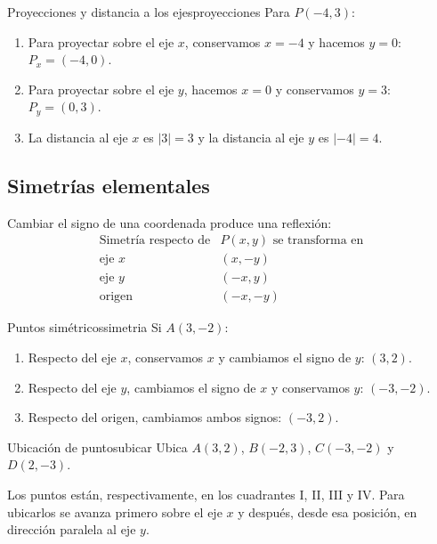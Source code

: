 \begin{example}{Proyecciones y distancia a los ejes}{proyecciones}
Para $P(-4,3)$:
\begin{enumerate}[label=\textbf{Paso \arabic*.}]
  \item Para proyectar sobre el eje $x$, conservamos $x=-4$ y hacemos $y=0$:
  $P_x=(-4,0)$.
  \item Para proyectar sobre el eje $y$, hacemos $x=0$ y conservamos $y=3$:
  $P_y=(0,3)$.
  \item La distancia al eje $x$ es $|3|=3$ y la distancia al eje $y$ es
  $|-4|=4$.
\end{enumerate}
\end{example}

\subsection{Simetrías elementales}

Cambiar el signo de una coordenada produce una reflexión:
\[
\begin{array}{c|c}
\text{Simetría respecto de} & P(x,y)\text{ se transforma en}\\ \hline
\text{eje }x & (x,-y)\\
\text{eje }y & (-x,y)\\
\text{origen} & (-x,-y)
\end{array}
\]

\begin{example}{Puntos simétricos}{simetria}
Si $A(3,-2)$:
\begin{enumerate}[label=\textbf{Paso \arabic*.}]
  \item Respecto del eje $x$, conservamos $x$ y cambiamos el signo de $y$:
  $(3,2)$.
  \item Respecto del eje $y$, cambiamos el signo de $x$ y conservamos $y$:
  $(-3,-2)$.
  \item Respecto del origen, cambiamos ambos signos: $(-3,2)$.
\end{enumerate}
\end{example}

\begin{example}{Ubicación de puntos}{ubicar}
Ubica $A(3,2)$, $B(-2,3)$, $C(-3,-2)$ y $D(2,-3)$.

\begin{center}
\end{center}
Los puntos están, respectivamente, en los cuadrantes I, II, III y IV.
Para ubicarlos se avanza primero sobre el eje $x$ y después, desde esa
posición, en dirección paralela al eje $y$.
\end{example}

